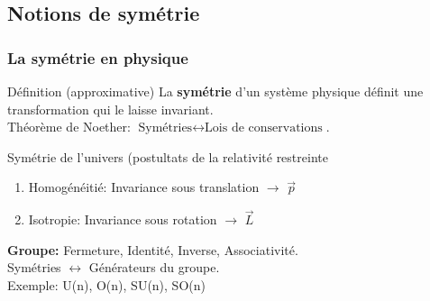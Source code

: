 \documentclass[handout]{beamer}
\begin{document}
\subsection{Notions de symétrie}
\begin{frame}\frametitle{La symétrie en physique}
\begin{block}{Définition (approximative)}
La \textbf{symétrie} d'un système physique définit une transformation qui le laisse invariant.\\
Théorème de Noether: $\text{Symétries} \leftrightarrow \text{Lois de conservations}$.
\end{block}


\begin{exampleblock}{Symétrie de l'univers (postultats de la relativité restreinte}
\begin{enumerate}
\item Homogénéitié: Invariance sous translation $\rightarrow$ $\vec{p}$ 
\item Isotropie: Invariance sous rotation $\rightarrow$ $\vec{L}$
\end{enumerate}
\end{exampleblock}
\textbf{Groupe:} Fermeture, Identité, Inverse, Associativité.\\  Symétries $\leftrightarrow$ Générateurs du groupe.\\
Exemple: U(n), O(n), SU(n), SO(n)
\end{frame}
\end{document}
